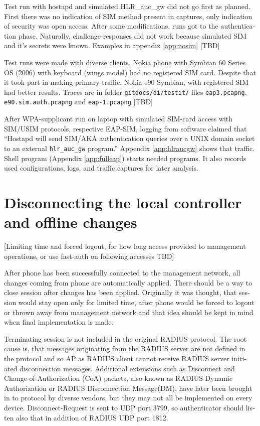 \documentclass[12pt,a4paper,english]{tutthesis}
\begin{document}
\begin{otherlanguage}{english}
Test run with hostapd and simulated HLR\_auc\_gw
did not go first as planned. First there was no indication of SIM method
present in captures, only indication of security was open access.
After some modifications, runs got to the authentication phase.
Naturally, challenge-responses did not work 
because simulated SIM and it's secrets were known. 
Examples in appendix \ref{app:nosim}   [TBD]



Test runs were made with diverse clients.
Nokia phone with Symbian 60 Series OS (2006) with keyboard
(wings model) had no registered SIM card. Despite that it took part in making
primary traffic.
Nokia e90 Symbian, with registered SIM had better results. Traces
are in folder \verb~gitdocs/di/testit/~ files \verb~eap3.pcapng~,
  \verb~e90.sim.auth.pcapng~ and \verb~eap-1.pcapng~  [TBD]

After WPA-supplicant run on laptop with simulated SIM-card access 
with SIM/USIM protocols, respective EAP-SIM, logging 
from software claimed that ``Hostapd will send SIM/AKA authentication
queries over a UNIX domain socket to an external \verb~hlr_auc_gw~ program.''
Appendix \ref{app:hlraucgw}   shows that traffic.
Shell program (Appendix \ref{app:fulleap}) starts needed programs. It also records used
configurations, logs, and traffic captures for later analysis.

\section{Disconnecting the local controller and offline changes}
\label{sec-5-3}
[Limiting time and forced logout, for how long access provided to
management operations, or use fast-auth on following accesses TBD]

After phone has been successfully connected to the management network,
all changes coming from 
phone are automatically applied. There should be a way to close
session after changes has been applied. Originally it was thought,
that session would stay open only for limited time, after phone would
be forced to logout or thrown away from management network and 
that idea should be kept in mind when final implementation is made.



Terminating session is not included in the original RADIUS protocol.
The root cause is, that 
messages originating from the RADIUS server are not
defined in the protocol and so AP as RADIUS client cannot receive
RADIUS server initiated disconnection messages. Additional extensions
such as Disconnect and Change-of-Authorization (CoA) packets, also
known as RADIUS Dynamic Authorization or RADIUS Disconnection
Message(DM),  have later been brought in\cite{rfc5176} to protocol by
diverse vendors, but they may not all be implemented on every device. 
Disconnect-Request is sent to UDP port 3799, so authenticator should
listen also that in addition of RADIUS UDP port 1812.







\end{otherlanguage}
\end{document}
